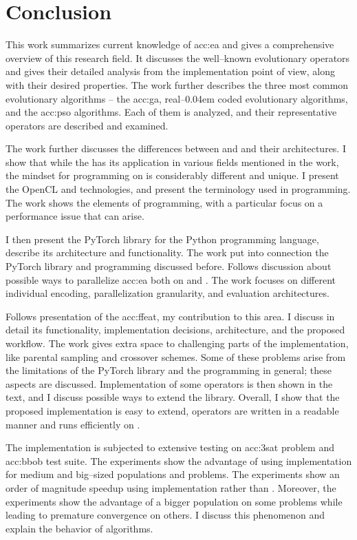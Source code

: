 \chapter{Conclusion}
\label{chap:conclusion}

This work summarizes current knowledge of \acrlong*{acc:ea} and gives a comprehensive overview of this research field. It discusses the well--known evolutionary operators and gives their detailed analysis from the implementation point of view, along with their desired properties. The work further describes the three most common evolutionary algorithms -- the \acrlong{acc:ga}, real--\kern0.04em coded evolutionary algorithms, and the \acrlong{acc:pso} algorithms. Each of them is analyzed, and their representative operators are described and examined.

The work further discusses the differences between \cpu and \gpu and their architectures. I show that while the \gpu has its application in various fields mentioned in the work, the mindset for programming on \gpu is considerably different and unique. I present the OpenCL and \cuda technologies, and present the terminology used in \gpu programming. The work shows the elements of \cuda programming, with a particular focus on a performance issue that can arise. 

I then present the PyTorch library for the Python programming language, describe its architecture and functionality. The work put into connection the PyTorch library and \cuda programming discussed before. Follows discussion about possible ways to parallelize \acrlong{acc:ea} both on \cpu and \gpuns. The work focuses on different individual encoding, parallelization granularity, and evaluation architectures.

Follows presentation of the \acrfull{acc:ffeat}, my contribution to this area. I discuss in detail its functionality, implementation decisions, architecture, and the proposed workflow. The work gives extra space to challenging parts of the implementation, like parental sampling and crossover schemes. Some of these problems arise from the limitations of the PyTorch library and the \cuda programming in general; these aspects are discussed. Implementation of some operators is then shown in the text, and I discuss possible ways to extend the library. Overall, I show that the proposed implementation is easy to extend, operators are written in a readable manner and runs efficiently on \gpuns.

The implementation is subjected to extensive testing on \acrshort{acc:3sat} problem and \acrshort{acc:bbob} test suite. The experiments show the advantage of using \cuda implementation for medium and big--sized populations and problems. The experiments show an order of magnitude speedup using \cuda implementation rather than \cpuns. Moreover, the experiments show the advantage of a bigger population on some problems while leading to premature convergence on others. I discuss this phenomenon and explain the behavior of algorithms.

